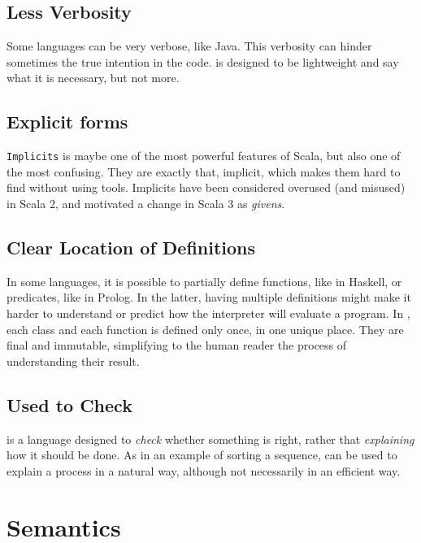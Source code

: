 \subsection{Less Verbosity}

Some languages can be very verbose, like Java.
This verbosity can hinder sometimes the true intention in the code.
\Soda is designed to be lightweight and say what it is necessary, but not more.

\subsection{Explicit forms}

\texttt{Implicits} is maybe one of the most powerful features of Scala, but also one of the most confusing.
They are exactly that, implicit, which makes them hard to find without using tools.
Implicits have been considered overused (and misused) in Scala 2, and motivated a change in Scala 3 as \textit{givens}.

\subsection{Clear Location of Definitions}

In some languages, it is possible to partially define functions, like in Haskell, or predicates, like in Prolog.
In the latter, having multiple definitions might make it harder to understand or predict how the interpreter will evaluate a program.
In \Soda, each class and each function is defined only once, in one unique place.
They are final and immutable, simplifying to the human reader the process of understanding their result.

\subsection{Used to Check}

\Soda is a language designed to \textit{check} whether something is right, rather that \textit{explaining} how it should be done.
As in an example of sorting a sequence, \Soda can be used to explain a process in a natural way, although not necessarily in an efficient way.


\section{Semantics}

\newcommand{\I}[1]{\ensuremath{{#1}^{\mathcal{I}}}}

